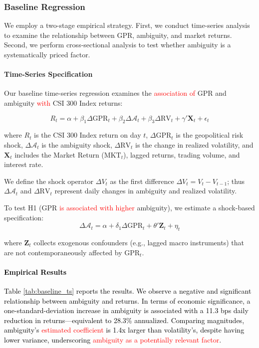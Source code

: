 \documentclass[preprint,12pt,authoryear]{elsarticle}
\begin{document}
\subsubsection{Baseline Regression}

We employ a two-stage empirical strategy. First, we conduct time-series analysis to examine the relationship between GPR, ambiguity, and market returns. Second, we perform cross-sectional analysis to test whether ambiguity is a systematically priced factor.

\paragraph{Time-Series Specification}
Our baseline time-series regression examines the \textcolor{red}{association of} GPR and ambiguity \textcolor{red}{with} CSI 300 Index returns:

\begin{equation}
R_{t} = \alpha + \beta_1 \Delta \text{GPR}_{t} + \beta_2 \Delta \mathcal{A}_{t} + \beta_3 \Delta \text{RV}_{t} + \gamma' \mathbf{X}_{t} + \epsilon_{t}
\end{equation}

where $R_t$ is the CSI 300 Index return on day $t$, $\Delta \text{GPR}_t$ is the geopolitical risk shock, $\Delta \mathcal{A}_t$ is the ambiguity shock, $\Delta \text{RV}_t$ is the change in realized volatility, and $\mathbf{X}_t$ includes the Market Return ($\text{MKT}_t$), lagged returns, trading volume, and interest rate.

We define the shock operator $\Delta V_t$ as the first difference $\Delta V_t = V_t - V_{t-1}$; thus $\Delta \mathcal{A}_t$ and $\Delta \text{RV}_t$ represent daily changes in ambiguity and realized volatility.

To test H1 (GPR \textcolor{red}{is associated with higher} ambiguity), we estimate a shock-based specification:
\begin{equation}
\Delta \mathcal{A}_{t} = \alpha + \delta_1 \Delta \text{GPR}_{t} + \theta' \mathbf{Z}_{t} + \eta_{t}
\end{equation}

where $\mathbf{Z}_t$ collects exogenous confounders (e.g., lagged macro instruments) that are not contemporaneously affected by $\text{GPR}_t$.

\paragraph{\textcolor{black}{Empirical Results}}
\textcolor{black}{Table \ref{tab:baseline_ts} reports the results. We observe a negative and significant relationship between ambiguity and returns. In terms of economic significance, a one-standard-deviation increase in ambiguity is associated with a 11.3 bps daily reduction in returns---equivalent to 28.3\% annualized. Comparing magnitudes, ambiguity's \textcolor{red}{estimated coefficient} is 1.4x larger than volatility's, despite having lower variance, underscoring \textcolor{red}{ambiguity as a potentially relevant factor}.}
\end{document}
